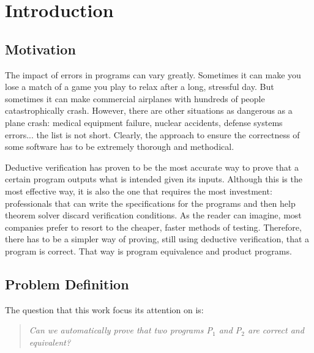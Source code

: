 
%

\chapter{Introduction}
\label{cha:introduction}

\section{Motivation} 

The impact of errors in programs can vary greatly.
Sometimes it can make you lose a match of a game you play to relax after a long, stressful day.
But sometimes it can make commercial airplanes with hundreds of people catastrophically crash.
However, there are other situations as dangerous as a plane crash: medical equipment failure, nuclear accidents, defense systems errors... the list is not short.
Clearly, the approach to ensure the correctness of some software has to be extremely thorough and methodical.

Deductive verification has proven to be the most accurate way to prove that a certain program outputs what is intended given its inputs.
Although this is the most effective way, it is also the one that requires the most investment: professionals that can write the specifications for the programs and then help theorem solver discard verification conditions.
As the reader can imagine, most companies prefer to resort to the cheaper, faster methods of testing.
Therefore, there has to be a simpler way of proving, still using deductive verification, that a program is correct.
That way is program equivalence and product programs.


\section{Problem Definition}

The question that this work focus its attention on is:

\begin{quote}
    \centering
    \emph{Can we automatically prove that two programs P$_1$ and P$_2$ are correct and equivalent?}
\end{quote}

